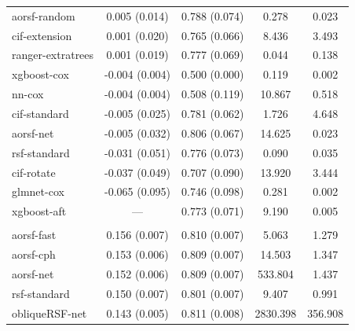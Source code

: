 \documentclass{article}\usepackage[]{graphicx}\usepackage[]{xcolor}
\newenvironment{knitrout}{}{} %
\begin{document}
\begin{knitrout}
\begin{longtable}[t]{lcccc}
\hspace{1em}aorsf-random & 0.005 (0.014) & 0.788 (0.074) & 0.278 & 0.023\\
\hspace{1em}cif-extension & 0.001 (0.020) & 0.765 (0.066) & 8.436 & 3.493\\
\hspace{1em}ranger-extratrees & 0.001 (0.019) & 0.777 (0.069) & 0.044 & 0.138\\
\hspace{1em}xgboost-cox & -0.004 (0.004) & 0.500 (0.000) & 0.119 & 0.002\\
\hspace{1em}nn-cox & -0.004 (0.004) & 0.508 (0.119) & 10.867 & 0.518\\
\hspace{1em}cif-standard & -0.005 (0.025) & 0.781 (0.062) & 1.726 & 4.648\\
\hspace{1em}aorsf-net & -0.005 (0.032) & 0.806 (0.067) & 14.625 & 0.023\\
\hspace{1em}rsf-standard & -0.031 (0.051) & 0.776 (0.073) & 0.090 & 0.035\\
\hspace{1em}cif-rotate & -0.037 (0.049) & 0.707 (0.090) & 13.920 & 3.444\\
\hspace{1em}glmnet-cox & -0.065 (0.095) & 0.746 (0.098) & 0.281 & 0.002\\
\hspace{1em}xgboost-aft & --- & 0.773 (0.071) & 9.190 & 0.005\\
\addlinespace[0.3em]
\multicolumn{5}{l}{\textit{\textbf{ARIC; coronary heart disease, n = 13623, p = 41}}}\\
\hline
\hspace{1em}aorsf-fast & 0.156 (0.007) & 0.810 (0.007) & 5.063 & 1.279\\
\hspace{1em}aorsf-cph & 0.153 (0.006) & 0.809 (0.007) & 14.503 & 1.347\\
\hspace{1em}aorsf-net & 0.152 (0.006) & 0.809 (0.007) & 533.804 & 1.437\\
\hspace{1em}rsf-standard & 0.150 (0.007) & 0.801 (0.007) & 9.407 & 0.991\\
\hspace{1em}obliqueRSF-net & 0.143 (0.005) & 0.811 (0.008) & 2830.398 & 356.908\\

\end{longtable}
\end{knitrout}
\end{document}
